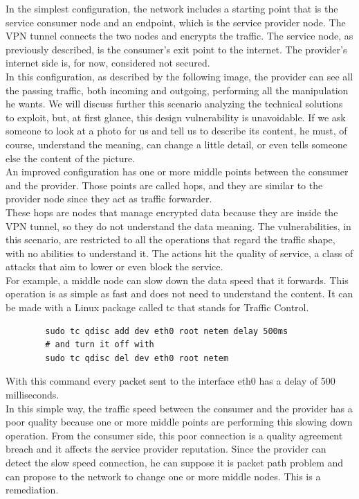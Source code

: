 \documentclass[]{article}
\begin{document}
	In the simplest configuration, the network includes a starting point that is the service consumer node and an endpoint, which is the service provider node. The VPN tunnel connects the two nodes and encrypts the traffic. The service node, as previously described, is the consumer's exit point to the internet. The provider's internet side is, for now, considered not secured.\\
	In this configuration, as described by the following image, the provider can see all the passing traffic, both incoming and outgoing, performing all the manipulation he wants. We will discuss further this scenario analyzing the technical solutions to exploit, but, at first glance, this design vulnerability is unavoidable. If we ask someone to look at a photo for us and tell us to describe its content, he must, of course, understand the meaning, can change a little detail, or even tells someone else the content of the picture.\\
	
	An improved configuration has one or more middle points between the consumer and the provider. Those points are called hops, and they are similar to the provider node since they act as traffic forwarder.\\
	These hops are nodes that manage encrypted data because they are inside the VPN tunnel, so they do not understand the data meaning. The vulnerabilities, in this scenario, are restricted to all the operations that regard the traffic shape, with no abilities to understand it. The actions hit the quality of service, a class of attacks that aim to lower or even block the service.\\
	For example, a middle node can slow down the data speed that it forwards. This operation is as simple as fast and does not need to understand the content. It can be made with a Linux package called tc \cite{tc} that stands for Traffic Control.\\

	\begin{verbatim}
		sudo tc qdisc add dev eth0 root netem delay 500ms
		# and turn it off with
		sudo tc qdisc del dev eth0 root netem
	\end{verbatim}

	With this command every packet sent to the interface eth0 has a delay of 500 milliseconds.\\
	In this simple way, the traffic speed between the consumer and the provider has a poor quality because one or more middle points are performing this slowing down operation. From the consumer side, this poor connection is a quality agreement breach and it affects the service provider reputation. Since the provider can detect the slow speed connection, he can suppose it is packet path problem and can propose to the network to change one or more middle nodes. This is a remediation.
\end{document}
